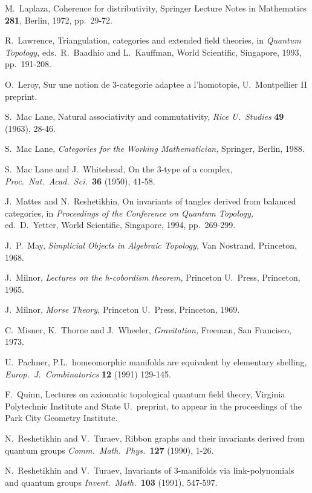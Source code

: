 \begin{thebibliography}{10}
 M.\ Laplaza, Coherence for distributivity,
Springer Lecture Notes in Mathematics {\bf 281}, Berlin, 1972,
pp.\ 29-72.

 R.\ Lawrence, Triangulation, categories and
extended field theories, in {\sl Quantum Topology,} eds.\ R.\ Baadhio
and L.\ Kauffman, World Scientific, Singapore, 1993, pp.\
191-208.

 O.\ Leroy, Sur une notion de 3-categorie adaptee
a l'homotopie, U.\ Montpellier II preprint.

 S.\ Mac Lane, Natural associativity and
commutativity, {\sl Rice U.\ Studies} {\bf 49} (1963), 28-46.

 S.\ Mac Lane, {\sl Categories for the Working
Mathematician,} Springer, Berlin, 1988.

 S.\ Mac Lane and J.\ Whitehead, On the 3-type of a complex,
{\sl Proc.\ Nat.\ Acad.\ Sci.\ }{\bf 36} (1950), 41-58.

 J.\ Mattes and N.\ Reshetikhin, On invariants of
tangles derived from balanced categories, in {\sl Proceedings of
the Conference on Quantum Topology,} ed.\ D.\ Yetter, World
Scientific, Singapore, 1994, pp.\ 269-299.

 J.\ P.\ May, {\sl Simplicial Objects in Algebraic Topology,}
Van Nostrand, Princeton, 1968.

 J.\ Milnor, {\sl Lectures on the h-cobordism theorem,}
Princeton U.\ Press, Princeton, 1965.

 J.\ Milnor, {\sl Morse Theory,} Princeton U.\ Press,
Princeton, 1969.

  C.\ Misner, K.\ Thorne and J.\ Wheeler, {\sl Gravitation,}
Freeman, San Francisco, 1973.

 U.\ Pachner, P.L.\ homeomorphic manifolds are equivalent by
elementary shelling, {\sl Europ.\ J.\ Combinatorics} {\bf 12} (1991) 129-145.

 F.\ Quinn, Lectures on axiomatic topological quantum
field theory, Virginia Polytechnic Institute and State U.\
preprint, to appear in the proceedings of
the Park City Geometry Institute.

N.\ Reshetikhin and V.\ Turaev, Ribbon
graphs and their invariants derived from quantum groups
{\sl Comm.\ Math.\ Phys.\ }{\bf 127}  (1990), 1-26.

N.\ Reshetikhin and V.\ Turaev, Invariants of
3-manifolds via link-polynomials and quantum groups {\sl Invent.\
Math.\ }{\bf 103} (1991), 547-597.


\end{thebibliography}
